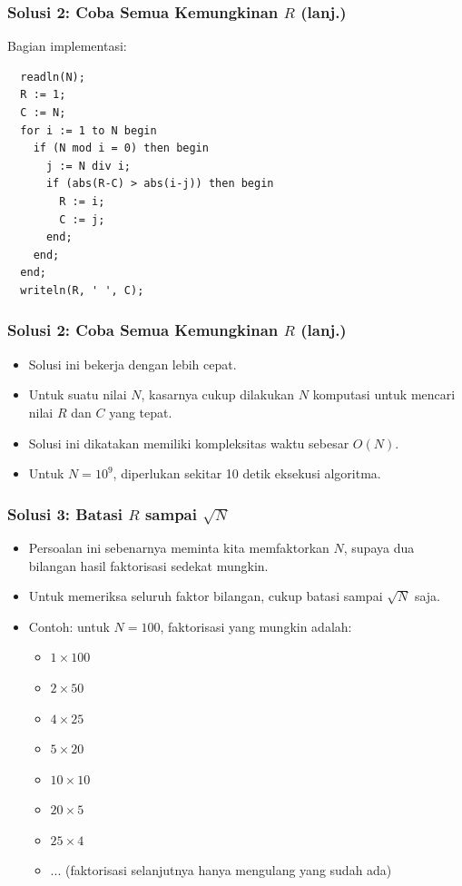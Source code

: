 \documentclass{beamer}
\begin{document}
\begin{frame}[fragile]
\frametitle{Solusi 2: Coba Semua Kemungkinan $R$ (lanj.)}
Bagian implementasi:
\begin{lstlisting}
  readln(N);
  R := 1;
  C := N;
  for i := 1 to N begin
    if (N mod i = 0) then begin
      j := N div i;
      if (abs(R-C) > abs(i-j)) then begin
        R := i;
        C := j;
      end;
    end;
  end;
  writeln(R, ' ', C);
\end{lstlisting}
\end{frame}

\begin{frame}[fragile]
\frametitle{Solusi 2: Coba Semua Kemungkinan $R$ (lanj.)}
\begin{itemize}
  \item Solusi ini bekerja dengan lebih cepat.
  \item Untuk suatu nilai $N$, kasarnya cukup dilakukan $N$ komputasi untuk mencari nilai $R$ dan $C$ yang tepat.
  \item Solusi ini dikatakan memiliki kompleksitas waktu sebesar $O(N)$.
  \item Untuk $N = 10^9$, diperlukan sekitar 10 detik eksekusi algoritma.
\end{itemize}
\end{frame}

\begin{frame}[fragile]
\frametitle{Solusi 3: Batasi $R$ sampai $\sqrt{N}$}
\begin{itemize}
  \item Persoalan ini sebenarnya meminta kita memfaktorkan $N$, supaya dua bilangan hasil faktorisasi sedekat mungkin.
  \item Untuk memeriksa seluruh faktor bilangan, cukup batasi sampai $\sqrt{N}$ saja.
  \item Contoh: untuk $N = 100$, faktorisasi yang mungkin adalah:
  \begin{itemize}
    \item $1 \times 100$
    \item $2 \times 50$
    \item $4 \times 25$
    \item $5 \times 20$
    \item $10 \times 10$
    \item $20 \times 5$
    \item $25 \times 4$
    \item $...$ (faktorisasi selanjutnya hanya mengulang yang sudah ada)
  \end{itemize}
\end{itemize}
\end{frame}
\end{document}
